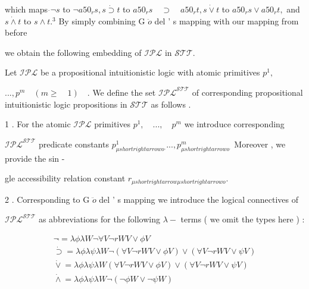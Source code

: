 \documentclass[10pt]{article}
\begin{document}
\noindent which maps  $\dot{}{ \neg }  s $  to  $ \neg   a50 _{ r }  s  ,   s   \dot{\supset}   t $  to  $ a50 _{ r }  s  \quad  \supset  \quad  a50 _{ r }  t  ,   s   \dot{\vee}   t $  to  $ a50 _{ r }  s   \vee   a50 _{ r }  t  , $  and  $ s   \dot{\wedge}   t $  
 to  $ s   \wedge   t  . ^{ 3 }$  By simply combining G  $ \ddot{o} $  del ' s mapping with our mapping from before 

\noindent we obtain the following embedding of  $ \mathcal{IPL} $  in  $ \mathcal{STT}  . $  

\hspace*{\fill}Let  $ \mathcal{IPL} $  be a propositional intuitionistic logic with atomic primitives  $ p ^{ 1 } , $  

\noindent  $ .   .   .   ,   p ^{ m } \quad  (  m   \geq  \quad  1  )  \quad  . $  We define the set  $ \mathcal{IPL} ^{ \mathcal{STT} }$  of corresponding propositional 
 intuitionistic logic propositions in  $ \mathcal{STT} $  as follows . 

\hspace*{\fill}1 . \quad For \quad the \quad atomic  $ \mathcal{IPL} $  \quad primitives  $ p ^{ 1 } ,  \quad  .   .   .   ,  \quad  p ^{ m }$  \quad we \quad introduce corresponding 

\hspace*{\fill} $ \mathcal{IPL} ^{ \mathcal{STT} }$  predicate constants  $ p ^{ 1 }_{ \mu  shortrightarrow  o ^{ , }}  .   .   .   ,   p ^{ m }_{ \mu  shortrightarrow  o ^{ . }}$  Moreover , we provide the sin - 

\centerline{gle accessibility relation constant  $ r _{ \mu  shortrightarrow  \mu  shortrightarrow  o } . $  }

\hspace*{\fill}2 . \quad Corresponding to G  $ \ddot{o} $  del ' s mapping we introduce the logical connectives of 

\hspace*{\fill} $ \mathcal{IPL} ^{ \mathcal{STT} }$  as abbreviations for the following  $ \lambda  - $  terms ( we omit the types here ) : 

\[\begin{aligned}\neg{ \dot{} }  =   \lambda  \phi   \lambda  W   \neg  \forall  V   \neg  r   W   V   \vee   \phi   V \\
  \dot{\supset}   =   \lambda  \phi   \lambda  \psi   \lambda  W   \neg  (  \forall  V   \neg  r   W   V   \vee   \phi  V  )   \vee   (  \forall  V   \neg  r   W   V   \vee   \psi   V  ) \\
  \dot{\vee}   =   \lambda  \phi   \lambda  \psi   \lambda  W   (  \forall  V   \neg  r   W   V   \vee   \phi   V  )   \vee   (  \forall  V   \neg  r   WV   \vee   \psi   V  ) \\
  \dot{\wedge}   =   \lambda  \phi   \lambda  \psi   \lambda  W   \neg  (  \neg  \phi  W   \vee   \neg  \psi   W  ) \end{aligned}\]
\end{document}
